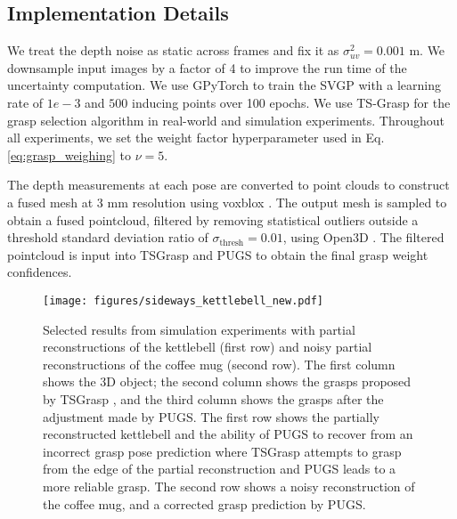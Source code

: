 \subsection{Implementation Details}
We treat the depth noise as static across frames and fix it as $\sigma_{uv}^2 = 0.001$ m.
We downsample input images by a factor of 4 to improve the run time of the uncertainty computation.
We use GPyTorch \cite{gardner2018gpytorch} to train the SVGP with a learning rate of $1e-3$ and $500$ inducing points over 100 epochs.
We use TS-Grasp \cite{player_real-time_2023} for the grasp selection algorithm in real-world and simulation experiments.
Throughout all experiments, we set the weight factor hyperparameter used in Eq. \eqref{eq:grasp_weighing} to $\nu = 5$.

The depth measurements at each pose are converted to point clouds to construct a fused mesh at 3 mm resolution using voxblox \cite{oleynikova2017voxblox}.
The output mesh is sampled to obtain a fused pointcloud, filtered by removing statistical outliers outside a threshold standard deviation ratio of $\sigma_\text{thresh}=0.01$, using Open3D \cite{Zhou2018}.
The filtered pointcloud is input into TSGrasp \cite{player_real-time_2023} and PUGS to obtain the final grasp weight confidences.


\begin{figure}[t]
    \centering
    \texttt{[image: figures/sideways\_kettlebell\_new.pdf]}
    \caption{Selected results from simulation experiments with partial reconstructions of the kettlebell (first row) and noisy partial reconstructions of the coffee mug (second row). The first column shows the 3D object; the second column shows the grasps proposed by TSGrasp \cite{player_real-time_2023}, and the third column shows the grasps after the adjustment made by PUGS.
    The first row shows the partially reconstructed kettlebell and the ability of PUGS to recover from an incorrect grasp pose prediction where TSGrasp attempts to grasp from the edge of the partial reconstruction and PUGS leads to a more reliable grasp.
    The second row shows a noisy reconstruction of the coffee mug, and a corrected grasp prediction by PUGS.}
    \label{fig:sideways_fail}
\end{figure}

